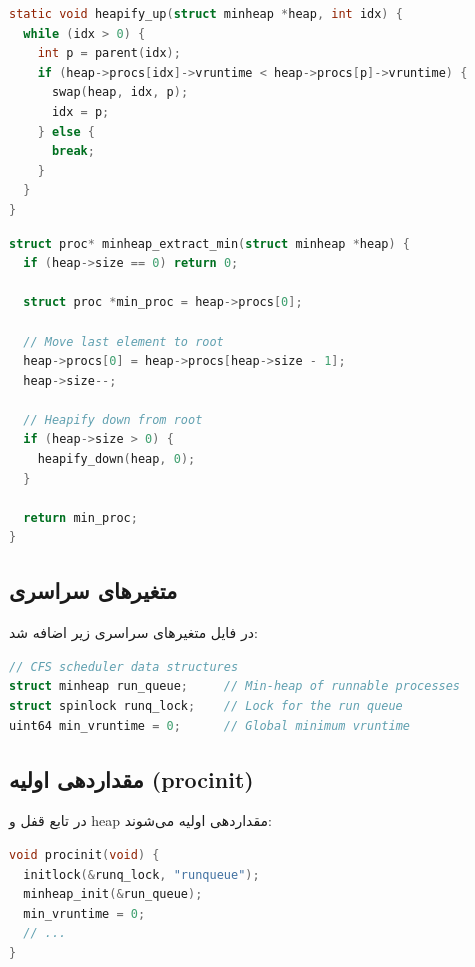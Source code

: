 \documentclass[12pt,a4paper]{article}
\begin{document}
\begin{latin}
\begin{lstlisting}[language=C, caption={تابع heapify\_up}]
static void heapify_up(struct minheap *heap, int idx) {
  while (idx > 0) {
    int p = parent(idx);
    if (heap->procs[idx]->vruntime < heap->procs[p]->vruntime) {
      swap(heap, idx, p);
      idx = p;
    } else {
      break;
    }
  }
}
\end{lstlisting}
\end{latin}

\begin{latin}
\begin{lstlisting}[language=C, caption={تابع extract\_min}]
struct proc* minheap_extract_min(struct minheap *heap) {
  if (heap->size == 0) return 0;
  
  struct proc *min_proc = heap->procs[0];
  
  // Move last element to root
  heap->procs[0] = heap->procs[heap->size - 1];
  heap->size--;
  
  // Heapify down from root
  if (heap->size > 0) {
    heapify_down(heap, 0);
  }
  
  return min_proc;
}
\end{lstlisting}
\end{latin}

\subsection{متغیرهای سراسری }
در فایل  متغیرهای سراسری زیر اضافه شد:

\begin{latin}
\begin{lstlisting}[language=C, caption={متغیرهای سراسری CFS}]
// CFS scheduler data structures
struct minheap run_queue;     // Min-heap of runnable processes
struct spinlock runq_lock;    // Lock for the run queue
uint64 min_vruntime = 0;      // Global minimum vruntime
\end{lstlisting}
\end{latin}

\subsection{مقداردهی اولیه (procinit)}
در تابع  قفل و heap مقداردهی اولیه می‌شوند:

\begin{latin}
\begin{lstlisting}[language=C, caption={مقداردهی اولیه CFS}]
void procinit(void) {
  initlock(&runq_lock, "runqueue");
  minheap_init(&run_queue);
  min_vruntime = 0;
  // ...
}
\end{lstlisting}
\end{latin}
\end{document}
